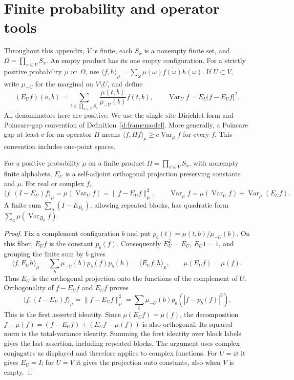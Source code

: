 \section{Finite probability and operator tools}
\label{a:finite}

Throughout this appendix, \(V\) is finite, each \(S_x\) is a
nonempty finite set, and \(\Omega=\prod_{x\in V}S_x\).
An empty product has its one empty configuration.  For a strictly
positive probability \(\mu\) on \(\Omega\), use
\(\langle f,h\rangle_\mu=\sum_\omega\mu(\omega)
\overline{f(\omega)}h(\omega)\).  If \(U\subset V\), write
\(\mu_{-U}\) for the marginal on \(V\setminus U\), and define
\[
 (E_Uf)(a,b)=\sum_{t\in\prod_{x\in U}S_x}
       \frac{\mu(t,b)}{\mu_{-U}(b)}f(t,b),\qquad
 \operatorname{Var}_U f=E_U|f-E_Uf|^2.
\]
All denominators here are positive.  We use the single-site Dirichlet
form and Poincare-gap convention of Definition~\ref{d:framemodel}.
More generally, a Poincare gap at least \(c\) for an operator \(H\)
means \(\langle f,Hf\rangle_\mu\ge c\operatorname{Var}_\mu f\)
for every \(f\).  This convention includes one-point spaces.

\begin{lemma}\label{l:CE}
For a positive probability \(\mu\) on a finite product
\(\Omega=\prod_{x\in V}S_x\), with nonempty finite alphabets,
\(E_U\) is a self-adjoint orthogonal projection preserving constants
and \(\mu\). For real or complex \(f\),
\[
 \langle f,(I-E_U)f\rangle_\mu
   =\mu(\operatorname{Var}_U f)=\|f-E_Uf\|_\mu^2,\qquad
 \operatorname{Var}_\mu f=\mu(\operatorname{Var}_U f)
                          +\operatorname{Var}_\mu(E_Uf).
\]
A finite sum \(\sum_a(I-E_{B_a})\), allowing repeated blocks,
has quadratic form \(\sum_a\mu(\operatorname{Var}_{B_a}f)\).
\end{lemma}

\begin{proof}
Fix a complement configuration \(b\) and put
\(p_b(t)=\mu(t,b)/\mu_{-U}(b)\).
On this fiber, \(E_Uf\) is the constant \(p_b(f)\).  Consequently
\(E_U^2=E_U\), \(E_U1=1\), and grouping the finite sum by \(b\)
gives
\[
 \langle f,E_Uh\rangle_\mu
   =\sum_b\mu_{-U}(b)\overline{p_b(f)}p_b(h)
   =\langle E_Uf,h\rangle_\mu,
 \qquad \mu(E_Uf)=\mu(f).
\]
Thus \(E_U\) is the orthogonal projection onto the functions of
the complement of \(U\).  Orthogonality of \(f-E_Uf\) and \(E_Uf\)
proves
\[
 \langle f,(I-E_U)f\rangle_\mu
   =\|f-E_Uf\|_\mu^2
   =\sum_b\mu_{-U}(b)p_b(|f-p_b(f)|^2).
\]
This is the first asserted identity.  Since \(\mu(E_Uf)=\mu(f)\),
the decomposition
\(f-\mu(f)=(f-E_Uf)+(E_Uf-\mu(f))\) is also orthogonal.
Its squared norm is the total-variance identity.  Summing the first
identity over block labels gives the last assertion, including repeated
blocks.  The argument uses complex conjugates as displayed and therefore
applies to complex functions.  For \(U=\varnothing\) it gives \(E_U=I\);
for \(U=V\) it gives the projection onto constants, also when \(V\)
is empty.
\end{proof}

